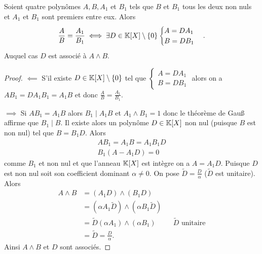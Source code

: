 \begin{theo}
  Soient quatre polynômes $A,B,A_1$ et $B_1$ tels que $B$ et $B_1$ tous les deux non nuls et $A_1$ et $B_1$ sont premiers entre eux. Alors
  \begin{equation}
    \frac{A}{B}=\frac{A_1}{B_1} \iff \exists D \in \mathbb{K}[X]\setminus\{0\} \begin{cases} A=DA_1 \\ B=DB_1 \end{cases}.
  \end{equation}
  Auquel cas $D$ est associé à $A\wedge B$.
\end{theo}
\begin{proof}
  $\impliedby$ S'il existe $D \in \mathbb{K}[X]\setminus\{0\}$ tel que $ \begin{cases} A=DA_1 \\ B=DB_1 \end{cases}$ alors on a $AB_1=DA_1B_1=A_1B$ et donc $\frac{A}{B}=\frac{A_1}{B_1}$.

  $\implies$ Si $AB_1=A_1B$ alors $B_1 \mid{}A_1B$ et $A_1 \wedge B_1=1$ donc le théorème de Gau\ss{} affirme que $B_1\mid{}B$. Il existe alors un polynôme $D \in \mathbb{K}[X]$ non nul (puisque $B$ est non nul) tel que $B=B_1D$. Alors
  \begin{align}
    AB_1=A_1B=A_1B_1D \\
    B_1(A-A_1D)=0
  \end{align}
  comme $B_1$ et non nul et que l'anneau $\mathbb{K}[X]$ est intègre on a $A=A_1D$. Puisque $D$ est non nul soit son coefficient dominant $\alpha \neq 0$. On pose $\widetilde{D}=\frac{D}{\alpha}$ ($\widetilde{D}$ est unitaire). Alors
  \begin{align}
    A \wedge B &= (A_1D) \wedge (B_1D) \\
    & = (\alpha A_1 \widetilde{D}) \wedge (\alpha B_1 \widetilde{D}) \\
    & = \widetilde{D} (\alpha A_1) \wedge (\alpha B_1) && \widetilde{D} \text{~unitaire}\\
    & = \widetilde{D} = \frac{D}{\alpha}.
  \end{align}
  Ainsi $A \wedge B$ et $D$ sont associés.
\end{proof}

